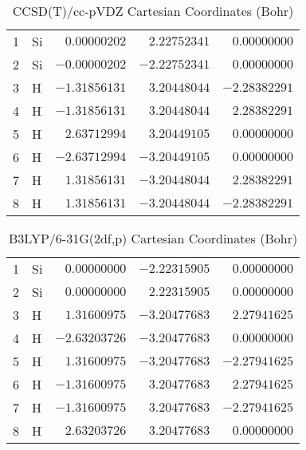 \documentclass[10pt,oneside]{article}
\begin{document}
\begin{table}[h!]
\centering
\caption{CCSD(T)/cc-pVDZ Cartesian Coordinates (Bohr)}
\begin{tabular}{llrrr}
1  & Si & $ 0.00000202$ & $ 2.22752341$ & $ 0.00000000$ \\
2  & Si & $-0.00000202$ & $-2.22752341$ & $ 0.00000000$ \\
3  & H  & $-1.31856131$ & $ 3.20448044$ & $-2.28382291$ \\
4  & H  & $-1.31856131$ & $ 3.20448044$ & $ 2.28382291$ \\
5  & H  & $ 2.63712994$ & $ 3.20449105$ & $ 0.00000000$ \\
6  & H  & $-2.63712994$ & $-3.20449105$ & $ 0.00000000$ \\
7  & H  & $ 1.31856131$ & $-3.20448044$ & $ 2.28382291$ \\
8  & H  & $ 1.31856131$ & $-3.20448044$ & $-2.28382291$ \\
\end{tabular}
\end{table}

\begin{table}[h!]
\centering
\caption{B3LYP/6-31G(2df,p) Cartesian Coordinates (Bohr)}
\begin{tabular}{llrrr}
1  & Si & $ 0.00000000$ & $-2.22315905$ & $ 0.00000000$ \\
2  & Si & $ 0.00000000$ & $ 2.22315905$ & $ 0.00000000$ \\
3  & H  & $ 1.31600975$ & $-3.20477683$ & $ 2.27941625$ \\
4  & H  & $-2.63203726$ & $-3.20477683$ & $ 0.00000000$ \\
5  & H  & $ 1.31600975$ & $-3.20477683$ & $-2.27941625$ \\
6  & H  & $-1.31600975$ & $ 3.20477683$ & $ 2.27941625$ \\
7  & H  & $-1.31600975$ & $ 3.20477683$ & $-2.27941625$ \\
8  & H  & $ 2.63203726$ & $ 3.20477683$ & $ 0.00000000$ \\
\end{tabular}
\end{table}

\clearpage
\end{document}
